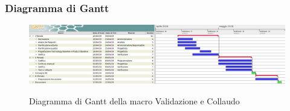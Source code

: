         
        \begin{landscape}
			\subsubsection{Diagramma di Gantt}        
			\begin{figure}[H]
					\centering
					\includegraphics[scale=0.42]{img/Validazione_e_collaudo.png}\\
					\caption{Diagramma di Gantt della macro Validazione e Collaudo}
			\end{figure}
		\end{landscape}
		\newpage
